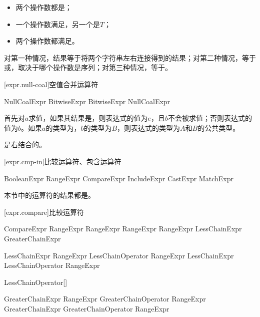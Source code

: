 \begin{itemize}
    \item 两个操作数都是；
    \item 一个操作数满足，另一个是$T$；
    \item 两个操作数都满足。
\end{itemize}

对第一种情况，结果等于将两个字符串左右连接得到的结果；对第二种情况，等于\tcode{[$x$, ...$y$]}或\tcode{[...$x$, $y$]}，取决于哪个操作数是序列；对第三种情况，等于\tcode{[...$x$, ...$y$]}。

[expr.null-coal]{空值合并运算符}

\begin{bnf}{NullCoalExpr}
    BitwiseExpr \br
    BitwiseExpr  NullCoalExpr
\end{bnf}

\pnum
{}首先对$a$求值，如果其结果是，则表达式的值为$e$，且$b$不会被求值；否则表达式的值为$b$。如果$a$的类型为，$b$的类型为$B$，则表达式的类型为$A$和$B$的公共类型。

\pnum
{}是右结合的。

[expr.cmp-in]{比较运算符、包含运算符}

\begin{bnf}{BooleanExpr}
    RangeExpr \br
    CompareExpr \br
    IncludeExpr \br
    CastExpr \br
    MatchExpr
\end{bnf}

\pnum
本节中的运算符的结果都是。

[expr.compare]{比较运算符}

\begin{bnf}{CompareExpr}
    RangeExpr \terminal{!=} RangeExpr \br
    RangeExpr  RangeExpr \br
    LessChainExpr \br
    GreaterChainExpr
\end{bnf}

\begin{bnf}{LessChainExpr}
    RangeExpr LessChainOperator RangeExpr \br
    LessChainExpr LessChainOperator RangeExpr
\end{bnf}

\begin{bnf}{LessChainOperator}[\oneof]
    \terminal{< == <=}
\end{bnf}

\begin{bnf}{GreaterChainExpr}
    RangeExpr GreaterChainOperator RangeExpr \br
    GreaterChainExpr GreaterChainOperator RangeExpr
\end{bnf}

